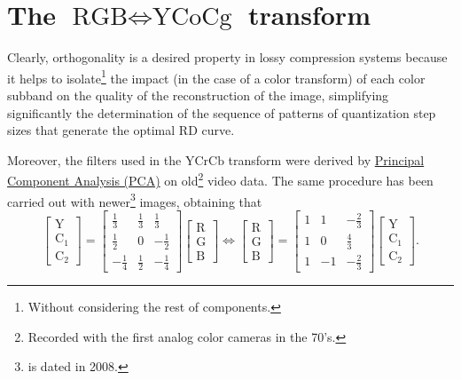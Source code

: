 \section{The $\text{RGB} \Leftrightarrow \text{YCoCg}$ transform}

Clearly, orthogonality is a desired property in lossy compression
systems because it helps to isolate\footnote{Without considering the
rest of components.} the impact (in the case of a color transform) of
each color subband on the quality of the reconstruction of the image,
simplifying significantly the determination of the sequence of
patterns of quantization step sizes that generate the optimal RD
curve.

Moreover, the filters used in the $\text{YCrCb}$ transform were derived by
\href{https://en.wikipedia.org/wiki/Principal_component_analysis}{Principal
  Component Analysis (PCA)} on old\footnote{Recorded with the first
analog color cameras in the 70's.} video data. The same procedure has
been carried out with newer\footnote{\cite{malvar2008lifting} is dated
in 2008.} images, obtaining that
\begin{equation}
  \begin{bmatrix}
    \text{Y} \\
    \text{C}_1 \\
    \text{C}_2
  \end{bmatrix}
  =
  \begin{bmatrix}
    \frac{1}{3} & \frac{1}{3} &  \frac{1}{3} \\ 
    \frac{1}{2} &           0 & -\frac{1}{2} \\
   -\frac{1}{4} & \frac{1}{2} & -\frac{1}{4}
  \end{bmatrix}
  \begin{bmatrix}
    \text{R} \\
    \text{G} \\
    \text{B}
  \end{bmatrix}
  \Leftrightarrow
  \begin{bmatrix}
    \text{R} \\
    \text{G} \\
    \text{B}
  \end{bmatrix}
  =
  \begin{bmatrix}
    1  &  1  & -\frac{2}{3} \\ 
    1  &  0  &  \frac{4}{3} \\ 
    1  & -1  & -\frac{2}{3}
  \end{bmatrix}
  \begin{bmatrix}
    \text{Y} \\
    \text{C}_1 \\
    \text{C}_2
  \end{bmatrix}.
  \label{eq:optimal}
\end{equation}

